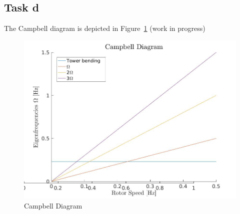 \documentclass[10pt]{article}
\begin{document}
\subsection{Task d}
The Campbell diagram is depicted in Figure~\ref{fig:campbell}  (work in progress)
\begin{figure}[H]
\centering
\includegraphics[width=1\linewidth]{../figures/campbell.jpg}
\caption{Campbell Diagram}
\label{fig:campbell}
\end{figure} 
\end{document}
